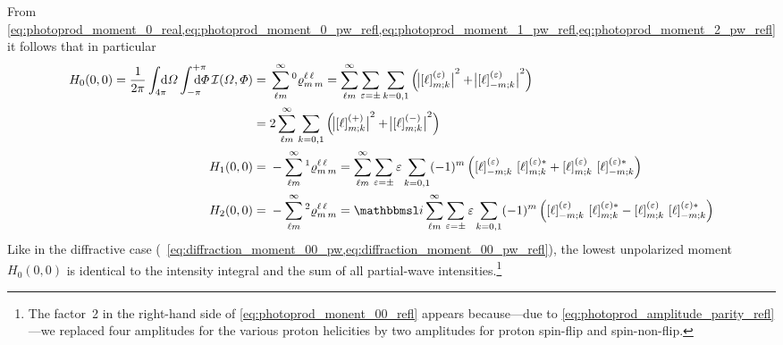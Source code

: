 From
\cref{eq:photoprod_moment_0_real,eq:photoprod_moment_0_pw_refl,eq:photoprod_moment_1_pw_refl,eq:photoprod_moment_2_pw_refl}
it follows that in particular
\begin{align}
  H_0(0, 0)
  = \frac{1}{2 \pi} \int_{4 \pi}\!\!\!\! \dif{\Omega} \int_{-\pi}^{+\pi}\hspace{-1.2em} \dif{\Phi}\,
  \mathcal{I}(\Omega, \Phi)
  ={}& \sum_{\ell m}^\infty \prescript{0}{}{\varrho}^{\ell\, \ell}_{m\, m}
  = \sum_{\ell m}^\infty \sum_{\refl = \pm} \sum_{k = 0, 1}
  \rBrk[2]{\Abs[1]{\sBrk{\ell}^{(\refl)}_{m; k}}^2 + \Abs[1]{\sBrk{\ell}^{(\refl)}_{{-m}; k}}^2} \notag
  \\
  \label{eq:photoprod_monent_00_refl}
  ={}& 2 \sum_{\ell m}^\infty \sum_{k = 0, 1}
  \rBrk[2]{\Abs[1]{\sBrk{\ell}^{(+)}_{m; k}}^2 + \Abs[1]{\sBrk{\ell}^{(-)}_{m; k}}^2}
  \\
  H_1(0, 0)
  ={}& -\sum_{\ell m}^\infty \prescript{1}{}{\varrho}^{\ell\, \ell}_{m\, m}
  = \sum_{\ell m}^\infty \sum_{\refl = \pm} \refl \sum_{k = 0, 1}
  (-1)^m \rBrk[2]{\sBrk{\ell}^{(\refl)}_{{-m}; k}\, \sBrk{\ell}^{(\refl) *}_{m; k}
  + \sBrk{\ell}^{(\refl)}_{m; k}\, \sBrk{\ell}^{(\refl) *}_{{-m}; k}}
  \\
  H_2(0, 0)
  ={}& -\sum_{\ell m}^\infty \prescript{2}{}{\varrho}^{\ell\, \ell}_{m\, m}
  = \imag \sum_{\ell m}^\infty \sum_{\refl = \pm} \refl \sum_{k = 0, 1}
  (-1)^m \rBrk[2]{\sBrk{\ell}^{(\refl)}_{{-m}; k}\, \sBrk{\ell}^{(\refl) *}_{m; k}
  - \sBrk{\ell}^{(\refl)}_{m; k}\, \sBrk{\ell}^{(\refl) *}_{{-m}; k}}
\end{align}
Like in the diffractive case (\confer\
\cref{eq:diffraction_moment_00_pw,eq:diffraction_moment_00_pw_refl}),
the lowest unpolarized moment $H_0(0, 0)$ is identical to the
intensity integral and the sum of all partial-wave
intensities.\footnote{The factor~2 in the right-hand side of
\cref{eq:photoprod_monent_00_refl} appears because---due to
\cref{eq:photoprod_amplitude_parity_refl}---we replaced four
amplitudes for the various proton helicities by two amplitudes for
proton spin-flip and spin-non-flip.}

